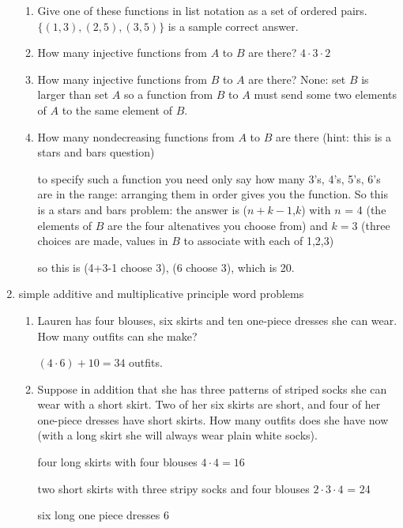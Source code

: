 \documentclass[12pt]{article}
\begin{document}
\begin{enumerate}
\begin{enumerate}
\item Give one of these functions in list notation as a set of ordered pairs.  $\{(1,3),(2,5),(3,5)\}$ is a sample correct answer.

\item How many injective functions from $A$ to $B$ are there?  $4 \cdot 3 \cdot 2$

\item How many injective functions from $B$ to $A$ are there?  None:  set $B$ is larger than set $A$ so a function from $B$ to $A$ must send some two elements of $A$ to the same element of $B$.

\item How many nondecreasing functions from $A$ to $B$ are there (hint:  this is a stars and bars question)

to specify such a function you need only say how many 3's, 4's, 5's, 6's are in the range:  arranging them in order
gives you the function.  So this is a stars and bars problem:  the answer is ($n+k-1$,$k$) with $n$ = 4 (the elements of $B$ are the four altenatives you choose from) and $k=3$ (three choices are made, values in $B$ to associate with each of 1,2,3)

so this is (4+3-1 choose 3), (6 choose 3), which is 20.



\end{enumerate}
\newpage

\item  simple additive and multiplicative principle word problems


 

\begin{enumerate}
\item Lauren has four blouses, six skirts and ten one-piece dresses she can wear.  How many outfits can she make?

$(4 \cdot 6) +10 = 34$ outfits.

\item  Suppose in addition that she has three patterns of striped socks she can wear with a short skirt.  Two of her six skirts are short, and four of her one-piece dresses have short skirts.  How many outfits does she have now (with a long skirt she will always wear plain white socks).

four long skirts with four blouses  $4 \cdot 4 = 16$

two short skirts with three stripy socks and four blouses  $2 \cdot 3 \cdot 4$ = 24

six long one piece dresses  $6$


\end{enumerate}
\end{enumerate}
\end{document}
